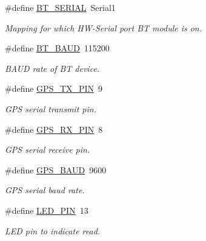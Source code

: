 \begin{DoxyCompactItemize}
\#define \hyperlink{logging-device_8ino_ad1e6e6f6fc813b305067b9e1b0777ea6}{B\+T\+\_\+\+S\+E\+R\+I\+AL}~Serial1
\begin{DoxyCompactList}\small\item\em Mapping for which H\+W-\/\+Serial port BT module is on. \end{DoxyCompactList}\item 
\mbox{\label{logging-device_8ino_a6882992121626898bccaa43be51ba4c2}} 
\#define \hyperlink{logging-device_8ino_a6882992121626898bccaa43be51ba4c2}{B\+T\+\_\+\+B\+A\+UD}~115200
\begin{DoxyCompactList}\small\item\em B\+A\+UD rate of BT device. \end{DoxyCompactList}\item 
\mbox{\label{logging-device_8ino_acae14b9c1767cfec367a4b96009c94e5}} 
\#define \hyperlink{logging-device_8ino_acae14b9c1767cfec367a4b96009c94e5}{G\+P\+S\+\_\+\+T\+X\+\_\+\+P\+IN}~9
\begin{DoxyCompactList}\small\item\em G\+PS serial transmit pin. \end{DoxyCompactList}\item 
\mbox{\label{logging-device_8ino_a6f8927970de9eedcbb8f6c14b1d0d6c3}} 
\#define \hyperlink{logging-device_8ino_a6f8927970de9eedcbb8f6c14b1d0d6c3}{G\+P\+S\+\_\+\+R\+X\+\_\+\+P\+IN}~8
\begin{DoxyCompactList}\small\item\em G\+PS serial receive pin. \end{DoxyCompactList}\item 
\mbox{\label{logging-device_8ino_af0875ffe69dbe45df3f85c1f720c3eee}} 
\#define \hyperlink{logging-device_8ino_af0875ffe69dbe45df3f85c1f720c3eee}{G\+P\+S\+\_\+\+B\+A\+UD}~9600
\begin{DoxyCompactList}\small\item\em G\+PS serial baud rate. \end{DoxyCompactList}\item 
\mbox{\label{logging-device_8ino_ab4553be4db9860d940f81d7447173b2f}} 
\#define \hyperlink{logging-device_8ino_ab4553be4db9860d940f81d7447173b2f}{L\+E\+D\+\_\+\+P\+IN}~13
\begin{DoxyCompactList}\small\item\em L\+ED pin to indicate read. \end{DoxyCompactList}\end{DoxyCompactItemize}
